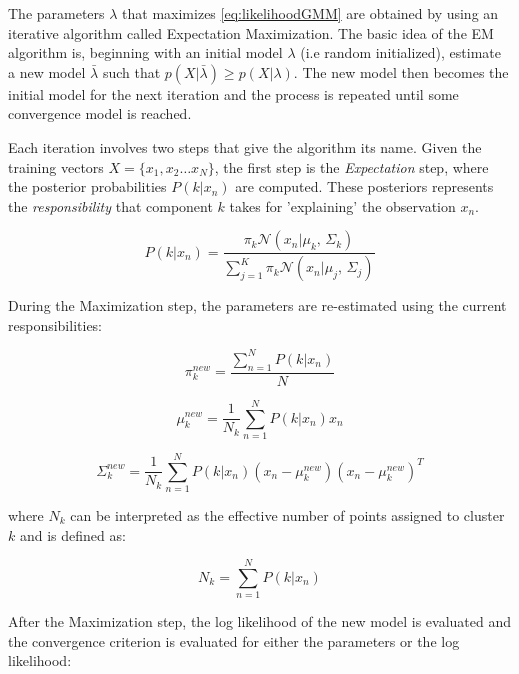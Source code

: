 The parameters $\lambda$ that maximizes \ref{eq:likelihoodGMM} are obtained by using an iterative
algorithm called Expectation Maximization. The basic idea of the EM algorithm is,
beginning with an initial model $\lambda$ (i.e random initialized), estimate a new model
$\bar{\lambda}$ such that $p(X|\bar{\lambda}) \geq p(X|\lambda)$. The new model then becomes
the initial model for the next iteration and the process is repeated until some convergence
model is reached.

Each iteration involves two steps that give the algorithm its name. Given the training vectors
$X=\{x_{1}, x_{2} \dotsc x_{N}\}$, the first step is the \emph{Expectation} step,
where the posterior probabilities $P(k|x_{n})$ are computed.
These posteriors represents the \emph{responsibility} that component $k$ takes for
'explaining' the observation $x_{n}$.

\begin{equation}
	P(k|x_{n}) = \frac{\pi_{k} \mathcal{N}(x_{n}|\mu_{k},\,\Sigma_{k})}{\sum_{j=1}^{K}\pi_{k} \mathcal{N}(x_{n}|\mu_{j},\,\Sigma_{j})}
	\label{eq:expectationStep}
\end{equation}

During the Maximization step, the parameters are re-estimated using the current responsibilities:

\begin{equation}
	\pi_{k}^{new} = \frac{\sum_{n=1}^{N}P(k|x_{n})}{N}
\end{equation}

\begin{equation}
	\label{eq:gmmExpectedValue}
	\mu_{k}^{new} = \frac{1}{N_{k}}\sum_{n=1}^{N}P(k|x_{n})x_{n}
\end{equation}

\begin{equation}
	\label{eq:gmmVariance}
	\Sigma_{k}^{new} = \frac{1}{N_{k}}\sum_{n=1}^{N}P(k|x_{n})(x_{n} - \mu_{k}^{new})(x_{n} - \mu_{k}^{new})^{T}
\end{equation}

where $N_{k}$ can be interpreted as the effective number of points assigned to cluster $k$
and is defined as:

\begin{equation}
	\label{eq:gmmNk}
	N_{k} = \sum_{n=1}^{N}P(k|x_{n})
\end{equation}

After the Maximization step, the log likelihood of the new model is evaluated and the convergence
criterion is evaluated for either the parameters or the log likelihood:

